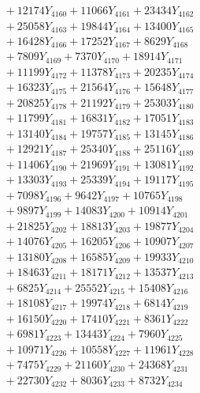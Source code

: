 \documentclass[a4paper,10pt]{article}
\begin{document}
{\begin{align}
&\;  + 12174 Y_{4160} + 11066 Y_{4161} + 23434 Y_{4162} \\[0.3ex]
&\;  + 25058 Y_{4163} + 19844 Y_{4164} + 13400 Y_{4165} \\[0.3ex]
&\;  + 16428 Y_{4166} + 17252 Y_{4167} + 8629 Y_{4168} \\[0.5ex]\allowbreak
&\;  + 7809 Y_{4169} + 7370 Y_{4170} + 18914 Y_{4171} \\[0.3ex]
&\;  + 11199 Y_{4172} + 11378 Y_{4173} + 20235 Y_{4174} \\[0.3ex]
&\;  + 16323 Y_{4175} + 21564 Y_{4176} + 15648 Y_{4177} \\[0.3ex]
&\;  + 20825 Y_{4178} + 21192 Y_{4179} + 25303 Y_{4180} \\[0.3ex]
&\;  + 11799 Y_{4181} + 16831 Y_{4182} + 17051 Y_{4183} \\[0.3ex]
&\;  + 13140 Y_{4184} + 19757 Y_{4185} + 13145 Y_{4186} \\[0.3ex]
&\;  + 12921 Y_{4187} + 25340 Y_{4188} + 25116 Y_{4189} \\[0.3ex]
&\;  + 11406 Y_{4190} + 21969 Y_{4191} + 13081 Y_{4192} \\[0.3ex]
&\;  + 13303 Y_{4193} + 25339 Y_{4194} + 19117 Y_{4195} \\[0.3ex]
&\;  + 7098 Y_{4196} + 9642 Y_{4197} + 10765 Y_{4198} \\[0.5ex]\allowbreak
&\;  + 9897 Y_{4199} + 14083 Y_{4200} + 10914 Y_{4201} \\[0.3ex]
&\;  + 21825 Y_{4202} + 18813 Y_{4203} + 19877 Y_{4204} \\[0.3ex]
&\;  + 14076 Y_{4205} + 16205 Y_{4206} + 10907 Y_{4207} \\[0.3ex]
&\;  + 13180 Y_{4208} + 16585 Y_{4209} + 19933 Y_{4210} \\[0.3ex]
&\;  + 18463 Y_{4211} + 18171 Y_{4212} + 13537 Y_{4213} \\[0.3ex]
&\;  + 6825 Y_{4214} + 25552 Y_{4215} + 15408 Y_{4216} \\[0.3ex]
&\;  + 18108 Y_{4217} + 19974 Y_{4218} + 6814 Y_{4219} \\[0.3ex]
&\;  + 16150 Y_{4220} + 17410 Y_{4221} + 8361 Y_{4222} \\[0.3ex]
&\;  + 6981 Y_{4223} + 13443 Y_{4224} + 7960 Y_{4225} \\[0.3ex]
&\;  + 10971 Y_{4226} + 10558 Y_{4227} + 11961 Y_{4228} \\[0.5ex]\allowbreak
&\;  + 7475 Y_{4229} + 21160 Y_{4230} + 24368 Y_{4231} \\[0.3ex]
&\;  + 22730 Y_{4232} + 8036 Y_{4233} + 8732 Y_{4234} \\[0.3ex]

\end{align}}
\end{document}
